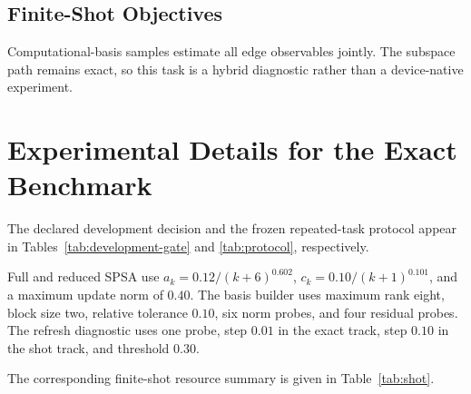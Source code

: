 \documentclass[aps,prx,reprint,superscriptaddress,floatfix]{revtex4-2}
\begin{document}
\subsection{Finite-Shot Objectives}
Computational-basis samples estimate all edge observables jointly.  The
subspace path remains exact, so this task is a hybrid diagnostic rather than a
device-native experiment.

\section{Experimental Details for the Exact Benchmark}

The declared development decision and the frozen repeated-task protocol appear
in Tables~\ref{tab:development-gate} and \ref{tab:protocol}, respectively.

\begin{table}[t]
\centering
\caption{\textbf{Declared exact-development decision.}  The
residual-gated method passes the random-basis and forward-cost conditions but
fails the one-percentage-point quality condition, so the conjunction fails.}
\label{tab:development-gate}
\resizebox{\textwidth}{!}{}
\end{table}

\begin{table}[t]
\centering
\caption{\textbf{Frozen repeated-task protocol.}  Measurement repeats are
nested before graph-level aggregation.}
\label{tab:protocol}
\resizebox{\textwidth}{!}{}
\end{table}

Full and reduced SPSA use
$a_k=0.12/(k+6)^{0.602}$,
$c_k=0.10/(k+1)^{0.101}$, and a maximum update norm of $0.40$.
The basis builder uses maximum rank eight, block size two, relative tolerance
$0.10$, six norm probes, and four residual probes.  The refresh diagnostic uses
one probe, step $0.01$ in the exact track, step $0.10$ in the shot track, and
threshold $0.30$.

The corresponding finite-shot resource summary is given in
Table~\ref{tab:shot}.

\begin{table}[t]
\centering
\caption{\textbf{Finite-shot repeated-task audit.}  ``Shots'' counts scalar
objective shots; the VJP column records simulator-only construction.}
\label{tab:shot}
\resizebox{\textwidth}{!}{}
\end{table}
\end{document}
